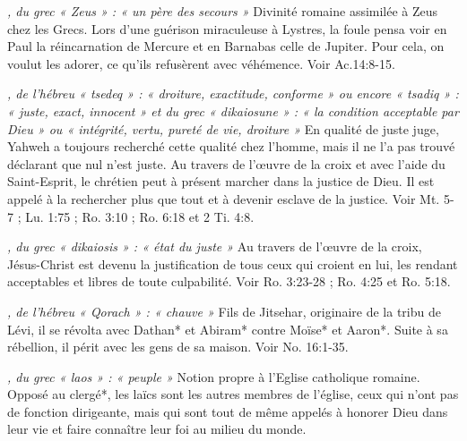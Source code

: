 \begin{multicols}{2}
\textit{, du grec « Zeus » : « un père des secours »}\newline
Divinité romaine assimilée à Zeus chez les Grecs. Lors d'une guérison miraculeuse à Lystres, la foule pensa voir en Paul la réincarnation de Mercure et en Barnabas celle de Jupiter. Pour cela, on voulut les adorer, ce qu'ils refusèrent avec véhémence. Voir Ac.14:8-15.

\textit{, de l'hébreu « tsedeq » : « droiture, exactitude, conforme » ou encore « tsadiq » : « juste, exact, innocent » et du grec « dikaiosune » : « la condition acceptable par Dieu » ou « intégrité, vertu, pureté de vie, droiture »}\newline
En qualité de juste juge, Yahweh a toujours recherché cette qualité chez l'homme, mais il ne l'a pas trouvé déclarant que nul n'est juste. Au travers de l'œuvre de la croix et avec l'aide du Saint-Esprit, le chrétien peut à présent marcher dans la justice de Dieu. Il est appelé à la rechercher plus que tout et à devenir esclave de la justice. Voir Mt. 5-7 ; Lu. 1:75 ; Ro. 3:10 ; Ro. 6:18 et 2 Ti. 4:8.

\textit{, du grec « dikaiosis » : « état du juste »}\newline
Au travers de l'œuvre de la croix, Jésus-Christ est devenu la justification de tous ceux qui croient en lui, les rendant acceptables et libres de toute culpabilité. Voir Ro. 3:23-28 ; Ro. 4:25 et Ro. 5:18.

\textit{, de l'hébreu « Qorach » : « chauve »}\newline
Fils de Jitsehar, originaire de la tribu de Lévi, il se révolta avec Dathan* et Abiram* contre Moïse* et Aaron*. Suite à sa rébellion, il périt avec les gens de sa maison. Voir No. 16:1-35.

\textit{, du grec « laos » : « peuple »}\newline
Notion propre à l'Eglise catholique romaine. Opposé au clergé*, les laïcs sont les autres membres de l'église, ceux qui n'ont pas de fonction dirigeante, mais qui sont tout de même appelés à honorer Dieu dans leur vie et faire connaître leur foi au milieu du monde.


\end{multicols}
